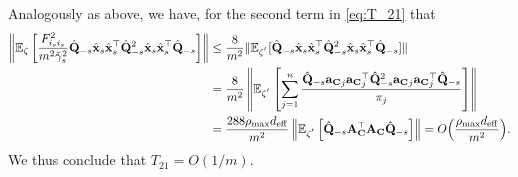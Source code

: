 \documentclass[11pt,a4paper]{article}
\begin{document}
Analogously as above, we have, for the second term in \eqref{eq:T_21} that
 \begin{align}
     \left \|{\mathbb{E}}_{\zeta}\left[\frac{F^2_{i_si_s}}{m^2\check \gamma^2_s}\hat{\mathbf{Q}}_{-s}\hat{\mathbf{x}}_s\hat{\mathbf{x}}_s^\top\hat{\mathbf{Q}}^2_{-s}\hat{\mathbf{x}}_s\hat{\mathbf{x}}_s^\top\hat{\mathbf{Q}}_{-s}\right]\right\|&\leq  \frac{8}{m^2} \|{\mathbb{E}}_{\zeta^{'}}[\hat{\mathbf{Q}}_{-s}\hat{\mathbf{x}}_s\hat{\mathbf{x}}_s^\top\hat{\mathbf{Q}}^2_{-s}\hat{\mathbf{x}}_s\hat{\mathbf{x}}_s^\top\hat{\mathbf{Q}}_{-s}]\|\nonumber\\
    &=\frac{8}{m^2} \left\|{\mathbb{E}}_{\zeta^{'}}\left[\sum^n_{j=1}\frac{\hat{\mathbf{Q}}_{-s}{\mathbf{a}_{\mathbf{C}}}_j{\mathbf{a}_{\mathbf{C}}}^\top_j\hat{\mathbf{Q}}^2_{-s}{\mathbf{a}_{\mathbf{C}}}_j{\mathbf{a}_{\mathbf{C}}}_j^\top\hat{\mathbf{Q}}_{-s}}{\pi_j}\right]\right\|\nonumber\\
    &=\frac{288\rho_{\max} d_{\mathrm{eff}}}{m^2}  \left\|{\mathbb{E}}_{\zeta^{'}}\left[\hat{\mathbf{Q}}_{-s}\mathbf{A}_{\mathbf{C}}^\top\mathbf{A}_{\mathbf{C}}\hat{\mathbf{Q}}_{-s}\right]\right\| = O\Big(\frac{\rho_{\max} d_{\mathrm{eff}}}{m^2}\Big).\nonumber
 \end{align}
We thus conclude that   $T_{21}=  O(1/m)$.
\end{document}
